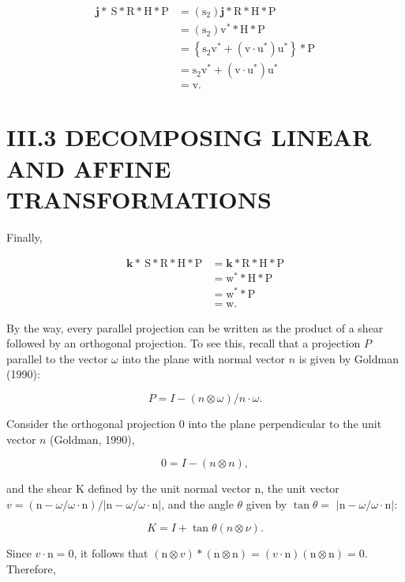 $$
\begin{aligned}
\mathbf{j} * \mathrm{~S} * \mathrm{R} * \mathrm{H} * \mathrm{P} &=\left(\mathrm{s}_{2}\right) \mathbf{j} * \mathrm{R} * \mathrm{H} * \mathrm{P} \\
&=\left(\mathrm{s}_{2}\right) \mathrm{v}^{*} * \mathrm{H} * \mathrm{P} \\
&=\left\{\mathrm{s}_{2} \mathrm{v}^{*}+\left(\mathrm{v} \cdot \mathrm{u}^{*}\right) \mathrm{u}^{*}\right\} * \mathrm{P} \\
&=\mathrm{s}_{2} \mathrm{v}^{*}+\left(\mathrm{v} \cdot \mathrm{u}^{*}\right) \mathrm{u}^{*} \\
&=\mathrm{v} .
\end{aligned}
$$

\section{III.3 DECOMPOSING LINEAR AND AFFINE TRANSFORMATIONS}
Finally,

$$
\begin{aligned}
\mathbf{k} * \mathrm{~S} * \mathrm{R} * \mathrm{H} * \mathrm{P} &=\mathbf{k} * \mathrm{R} * \mathrm{H} * \mathrm{P} \\
&=\mathrm{w}^{*} * \mathrm{H} * \mathrm{P} \\
&=\mathrm{w}^{*} * \mathrm{P} \\
&=\mathrm{w} .
\end{aligned}
$$

By the way, every parallel projection can be written as the product of a shear followed by an orthogonal projection. To see this, recall that a projection $P$ parallel to the vector $\omega$ into the plane with normal vector $n$ is given by Goldman (1990):

$$
P=I-(n \otimes \omega) / n \cdot \omega .
$$

Consider the orthogonal projection 0 into the plane perpendicular to the unit vector $n$ (Goldman, 1990),

$$
0=I-(n \otimes n),
$$

and the shear $\mathrm{K}$ defined by the unit normal vector $\mathrm{n}$, the unit vector $v=(\mathrm{n}-\omega / \omega \cdot \mathrm{n}) /|\mathrm{n}-\omega / \omega \cdot \mathrm{n}|$, and the angle $\theta$ given by $\tan \theta=$ $|\mathrm{n}-\omega / \omega \cdot \mathrm{n}|:$

$$
K=I+\tan \theta(n \otimes \nu) .
$$

Since $v \cdot \mathrm{n}=0$, it follows that $(\mathrm{n} \otimes v) *(\mathrm{n} \otimes \mathrm{n})=(v \cdot \mathrm{n})(\mathrm{n} \otimes \mathrm{n})=0$. Therefore,

